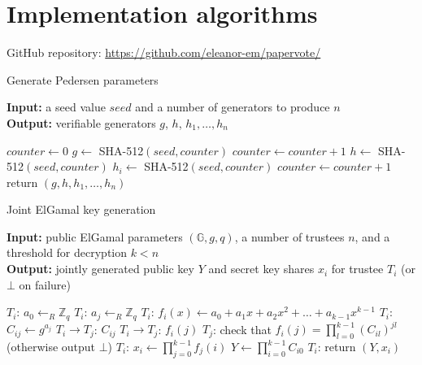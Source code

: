 \documentclass[12pt,a4paper]{article}
\theoremstyle{definition}
\begin{document}
\section{Implementation algorithms}\label{app-algorithms}
GitHub repository: \url{https://github.com/eleanor-em/papervote/}
\begin{algorithm} 	\caption{Generate Pedersen parameters}
\textbf{Input:} a seed value $\mathit{seed}$ and a number of generators to produce $n$\\
\textbf{Output:} verifiable generators $g$, $h$, $h_1, \ldots, h_n$
\begin{algorithmic}[1]
    \State  $\mathit{counter} \gets 0$
    \State  $g \gets$ SHA-512$(\mathit{seed}, \mathit{counter})$
    \State  $\textit{counter} \gets \mathit{counter} + 1$
    \State  $h \gets$ SHA-512$(\mathit{seed}, \mathit{counter})$
        \State $h_i \gets$ SHA-512$(\mathit{seed}, \mathit{counter})$
        \State  $\textit{counter} \gets \mathit{counter} + 1$
    \EndFor
    \State return $(g, h, h_1, \ldots, h_n)$
\end{algorithmic}
\end{algorithm}
\begin{algorithm}\caption{Joint ElGamal key generation}
\textbf{Input:} public ElGamal parameters $(\mathbb{G}, g, q)$, a number of trustees $n$, and a threshold for decryption $k < n$\\
\textbf{Output:} jointly generated public key $Y$ and secret key shares $x_i$ for trustee $T_i$ (or $\bot$ on failure)
\begin{algorithmic}[1]
    \State  $T_i$: $a_0 \gets_R \mathbb{Z}_q$
        \State $T_i$: $a_j \gets_R \mathbb{Z}_q$
    \EndFor
    \State $T_i$: $f_i(x)\gets a_0 + a_1 x + a_2 x^2 + \ldots + a_{k-1} x^{k-1}$
        \State $T_i$: $C_{ij} \gets g^{a_j}$
        \State $T_i\rightarrow T_j$: $C_{ij}$
    \EndFor
        \State $T_i\rightarrow T_j$: $f_i(j)$
        \State $T_j$: check that $f_i(j)=\prod_{l=0}^{k-1}\left(C_{il}\right)^{jl}$ (otherwise output $\bot$)
    \EndFor
    \State $T_i$: $x_i \gets \prod_{j=0}^{k-1} f_j(i)$
    \State $Y \gets \prod_{i=0}^{k-1} C_{i0}$
    \State $T_i$: return $(Y, x_i)$
\end{algorithmic}
\end{algorithm}
\end{document}
